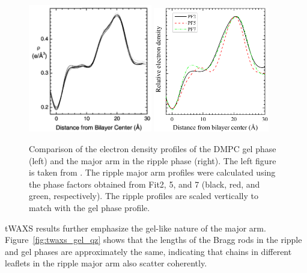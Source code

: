 \begin{figure}[htbp]
  \centering
  \includegraphics[width=0.48\textwidth]{figures/ripple/discussion/Tristram-Nagle_gel_DMPC}
  \includegraphics[width=0.45\textwidth]{figures/ripple/discussion/major_edp}
  \caption[Comparison of the electron density profiles of the DMPC gel phase (left)
  and the major arm in the ripple phase (right)]
  {Comparison of the electron density profiles of the DMPC gel phase (left)
  and the major arm in the ripple phase (right). The left figure is taken from 
  \cite{Tristram-Nagle02}. The ripple major arm profiles were calculated 
  using the phase factors obtained from Fit2, 5, and 7 (black, red, and green, respectively). 
  The ripple profiles are scaled vertically to match 
  with the gel phase profile.}
  \label{fig:gel_comparison}
\end{figure}

tWAXS results further emphasize the gel-like nature of the major arm.
Figure~\ref{fig:twaxs_gel_qz} shows that the lengths of the Bragg
rods in the ripple and gel phases are approximately the same, indicating that
chains in different leaflets in the ripple major arm also scatter coherently.

